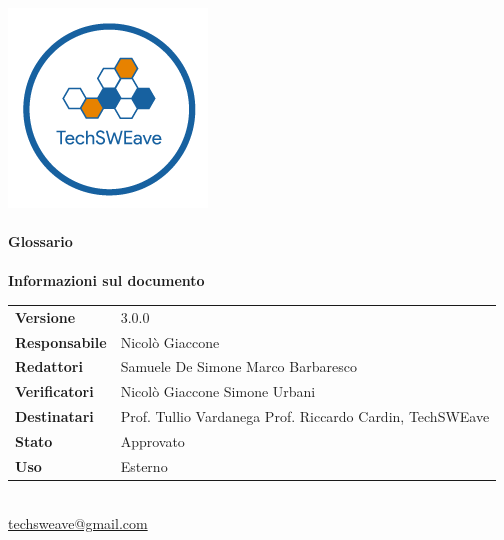 \documentclass[a4paper]{article}
\begin{document}
\begin{titlepage}
    \begin{center}
        \includegraphics{../../../Images/logo}\\
        \vspace{20px}
        \textcolor{logo}{\hrulefill}\\
        \vspace{20px}
        \textbf{\huge\textcolor{logo}{Glossario}}\\
        \vspace{10px}
        \textcolor{logo}{\hrulefill}\\
        \vspace{40px}
        \textbf{\Large Informazioni sul documento}\\
        \vspace{20px}
        \begin{tabular}{p{100px} | p{100px}}
            \textbf{Versione}     & 3.0.0                                                                      \\
            \textbf{Responsabile} & Nicolò Giaccone                                                            \\
            \textbf{Redattori}    & Samuele De Simone \newline Marco Barbaresco                                \\
            \textbf{Verificatori} & Nicolò Giaccone \newline Simone Urbani                                     \\
            \textbf{Destinatari}  & Prof. Tullio Vardanega \newline Prof. Riccardo Cardin, \newline TechSWEave \\
            \textbf{Stato}        & Approvato                                                                  \\
            \textbf{Uso}          & Esterno                                                                    \\
        \end{tabular}\\
        \vspace{60px}
        \href{mailto:techsweave@gmail.com}{techsweave@gmail.com}\\

    \end{center}
\end{titlepage}
\end{document}
